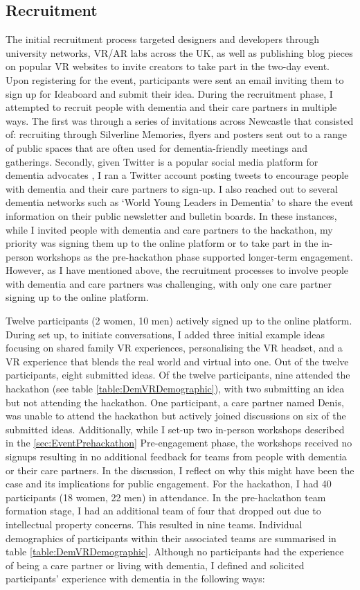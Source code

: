 \subsection{Recruitment}
\label{sec:EventRecruitment}
The initial recruitment process targeted designers and developers through university networks, VR/AR labs across the UK, as well as publishing blog pieces on popular VR websites to invite creators to take part in the two-day event. Upon registering for the event, participants were sent an email inviting them to sign up for Ideaboard and submit their idea. During the recruitment phase, I attempted to recruit people with dementia and their care partners in multiple ways. The first was through a series of invitations across Newcastle that consisted of: recruiting through Silverline Memories, flyers and posters sent out to a range of public spaces that are often used for dementia-friendly meetings and gatherings. Secondly, given Twitter is a popular social media platform for dementia advocates \citep{talbot_how_2020}, I ran a Twitter account posting tweets to encourage people with dementia and their care partners to sign-up. I also reached out to several dementia networks such as `World Young Leaders in Dementia' to share the event information on their public newsletter and bulletin boards. In these instances, while I invited people with dementia and care partners to the hackathon, my priority was signing them up to the online platform or to take part in the in-person workshops as the pre-hackathon phase supported longer-term engagement. However, as I have mentioned above, the recruitment processes to involve people with dementia and care partners was challenging, with only one care partner signing up to the online platform.


Twelve participants (2 women, 10 men) actively signed up to the online platform. During set up, to initiate conversations, I added three initial example ideas focusing on shared family VR experiences, personalising the VR headset, and a VR experience that blends the real world and virtual into one. Out of the twelve participants, eight submitted ideas. Of the twelve participants, nine attended the hackathon (see table \ref{table:DemVRDemographic}), with two submitting an idea but not attending the hackathon. One participant, a care partner named Denis, was unable to attend the hackathon but actively joined discussions on six of the submitted ideas. Additionally, while I set-up two in-person workshops described in the \ref{sec:EventPrehackathon} Pre-engagement phase, the workshops received no signups resulting in no additional feedback for teams from people with dementia or their care partners. In the discussion, I reflect on why this might have been the case and its implications for public engagement.
For the hackathon, I had 40 participants (18 women, 22 men) in attendance. In the pre-hackathon team formation stage, I had an additional team of four that dropped out due to intellectual property concerns. This resulted in nine teams. Individual demographics of participants within their associated teams are summarised in table \ref{table:DemVRDemographic}. Although no participants had the experience of being a care partner or living with dementia, I defined and solicited participants’ experience with dementia in the following ways:

